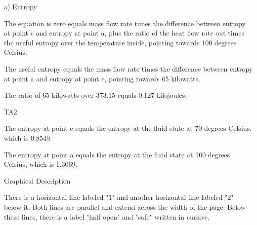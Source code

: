 a) Entropy

The equation is zero equals mass flow rate times the difference between entropy at point c and entropy at point a, plus the ratio of the heat flow rate out times the useful entropy over the temperature inside, pointing towards 100 degrees Celsius.

The useful entropy equals the mass flow rate times the difference between entropy at point a and entropy at point e, pointing towards 65 kilowatts.

The ratio of 65 kilowatts over 373.15 equals 0.127 kilojoules.

TA2

The entropy at point e equals the entropy at the fluid state at 70 degrees Celsius, which is 0.8549.

The entropy at point a equals the entropy at the fluid state at 100 degrees Celsius, which is 1.3069.

Graphical Description

There is a horizontal line labeled "1" and another horizontal line labeled "2" below it. Both lines are parallel and extend across the width of the page. Below these lines, there is a label "half open" and "safe" written in cursive.